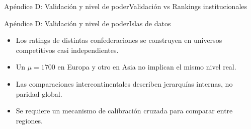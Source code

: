 \documentclass[aspectratio=169,11pt]{beamer}
\begin{document}
\begin{frame}{Ap\'endice D: Validaci\'on y nivel de poder}{Validaci\'on vs Rankings institucionales\supercite{clubelo2025,kassiesa2025,conmebol2026,footyrankings2025}}
	\centering
	\scriptsize
	\renewcommand{\arraystretch}{1.3}
	\vskip 2mm
\end{frame}

\begin{frame}{Ap\'endice D: Validaci\'on y nivel de poder}{Islas de datos}
	\par\vskip 2mm
	\footnotesize
	\begin{itemize}
		\item Los ratings de distintas confederaciones se construyen en universos competitivos casi independientes.
		\item Un $\mu = 1700$ en Europa y otro en Asia no implican el mismo nivel real.
		\item Las comparaciones intercontinentales describen jerarqu\'ias internas, no paridad global.
		\item Se requiere un mecanismo de calibraci\'on cruzada para comparar entre regiones.
	\end{itemize}
\end{frame}
\end{document}
